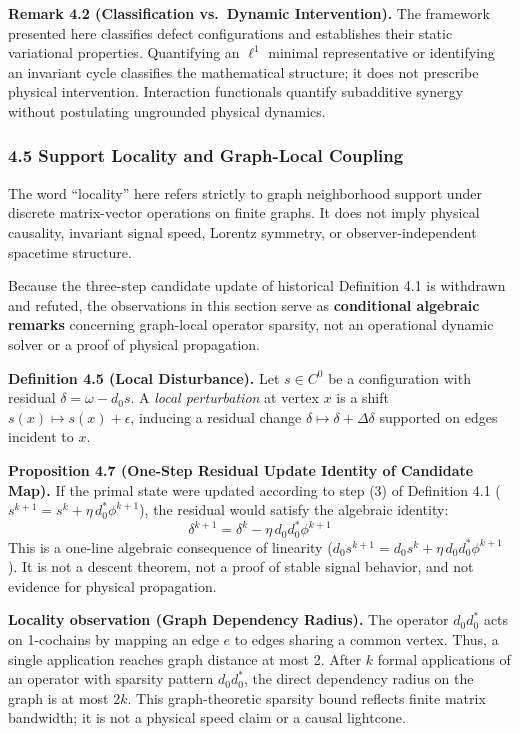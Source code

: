 \documentclass[
]{article}
\begin{document}
\textbf{Remark 4.2 (Classification vs.~Dynamic Intervention).} The framework presented here classifies defect configurations and establishes their static variational properties. Quantifying an \(\ell^1\) minimal representative or identifying an invariant cycle classifies the mathematical structure; it does not prescribe physical intervention. Interaction functionals quantify subadditive synergy without postulating ungrounded physical dynamics.

\subsubsection{4.5 Support Locality and Graph-Local Coupling}\label{support-locality-and-graph-local-coupling}

The word ``locality'' here refers strictly to graph neighborhood support under discrete matrix-vector operations on finite graphs. It does not imply physical causality, invariant signal speed, Lorentz symmetry, or observer-independent spacetime structure.

Because the three-step candidate update of historical Definition 4.1 is withdrawn and refuted, the observations in this section serve as \textbf{conditional algebraic remarks} concerning graph-local operator sparsity, not an operational dynamic solver or a proof of physical propagation.

\textbf{Definition 4.5 (Local Disturbance).} Let \(s \in C^0\) be a configuration with residual \(\delta = \omega - d_0 s\). A \emph{local perturbation} at vertex \(x\) is a shift \(s(x) \mapsto s(x) + \epsilon\), inducing a residual change \(\delta \mapsto \delta + \Delta \delta\) supported on edges incident to \(x\).

\textbf{Proposition 4.7 (One-Step Residual Update Identity of Candidate Map).} If the primal state were updated according to step (3) of Definition 4.1 (\(s^{k+1} = s^k + \eta \, d_0^* \phi^{k+1}\)), the residual would satisfy the algebraic identity:
\[ \delta^{k+1} = \delta^k - \eta \, d_0 d_0^* \phi^{k+1} \]
This is a one-line algebraic consequence of linearity (\(d_0 s^{k+1} = d_0 s^k + \eta \, d_0 d_0^* \phi^{k+1}\)). It is not a descent theorem, not a proof of stable signal behavior, and not evidence for physical propagation.

\textbf{Locality observation (Graph Dependency Radius).} The operator \(d_0 d_0^*\) acts on 1-cochains by mapping an edge \(e\) to edges sharing a common vertex. Thus, a single application reaches graph distance at most 2. After \(k\) formal applications of an operator with sparsity pattern \(d_0 d_0^*\), the direct dependency radius on the graph is at most \(2k\). This graph-theoretic sparsity bound reflects finite matrix bandwidth; it is not a physical speed claim or a causal lightcone.
\end{document}
